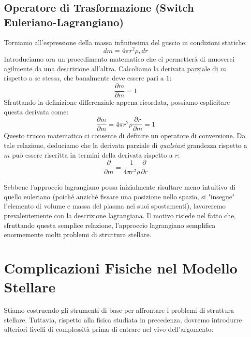 \subsection{Operatore di Trasformazione (Switch Euleriano-Lagrangiano)}

Torniamo all'espressione della massa infinitesima del guscio in condizioni statiche:
\begin{equation}
dm = 4\pi r^2 \rho , dr
\end{equation}
Introduciamo ora un procedimento matematico che ci permetterà di muoverci agilmente da una descrizione all'altra. Calcoliamo la derivata parziale di $m$ rispetto a se stessa, che banalmente deve essere pari a $1$:
\begin{equation}
\frac{\partial m}{\partial m} = 1
\end{equation}
Sfruttando la definizione differenziale appena ricordata, possiamo esplicitare questa derivata come:
\begin{equation}
\frac{\partial m}{\partial m} = 4\pi r^2 \rho \frac{\partial r}{\partial m} = 1
\end{equation}
Questo trucco matematico ci consente di definire un operatore di conversione. Da tale relazione, deduciamo che la derivata parziale di \textit{qualsiasi} grandezza rispetto a $m$ può essere riscritta in termini della derivata rispetto a $r$:
\begin{equation}
\frac{\partial}{\partial m} = \frac{1}{4\pi r^2 \rho} \frac{\partial}{\partial r}
\end{equation}

Sebbene l'approccio lagrangiano possa inizialmente risultare meno intuitivo di quello euleriano (poiché anziché fissare una posizione nello spazio, si "insegue" l'elemento di volume e massa del plasma nei suoi spostamenti), lavoreremo prevalentemente con la descrizione lagrangiana. Il motivo risiede nel fatto che, sfruttando questa semplice relazione, l'approccio lagrangiano semplifica enormemente molti problemi di struttura stellare.

\section{Complicazioni Fisiche nel Modello Stellare}

Stiamo costruendo gli strumenti di base per affrontare i problemi di struttura stellare. Tuttavia, rispetto alla fisica studiata in precedenza, dovremo introdurre ulteriori livelli di complessità prima di entrare nel vivo dell'argomento:

